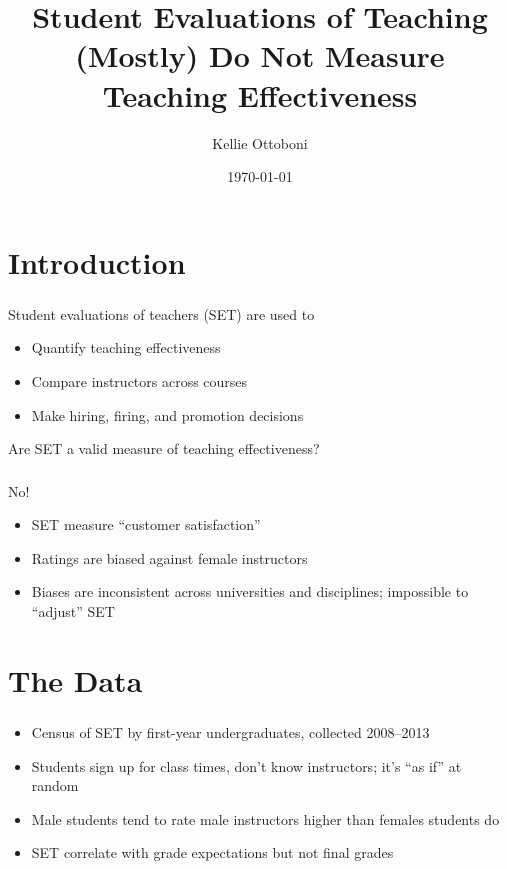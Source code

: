 \documentclass{beamer}
\title[SET]{Student Evaluations of Teaching (Mostly) Do Not Measure Teaching Effectiveness}
\author{Kellie Ottoboni}
\institute[]{Department of Statistics, UC Berkeley \\ Berkeley Institute for Data Science}
\date{\today}
\begin{document}
\frame{\titlepage}

\section{Introduction}
\frame
{
  \frametitle{}
 \begin{center}
 \Large{ Student evaluations of teachers (SET) are used to} \\
  \begin{itemize}
  \item Quantify teaching effectiveness
  \item Compare instructors across courses
  \item Make hiring, firing, and promotion decisions  
  \end{itemize}
  \vfill
Are SET a valid measure of teaching effectiveness?
\end{center}
}

\frame
{
  \frametitle{}
  \begin{center}
  \Huge{No!}
\vfill
\Large
  \begin{itemize}
  \item SET measure ``customer satisfaction''
  \item Ratings are biased against female instructors
  \item Biases are inconsistent across universities and disciplines; impossible to ``adjust'' SET
  \end{itemize}
  \end{center}
}

\section{The Data}
\frame
{
  \frametitle{\cite{Boring2015}}
  \Large
\begin{itemize}
\item Census of SET by first-year undergraduates, collected 2008--2013
\item Students sign up for class times, don't know instructors; it's ``as if'' at random
\item Male students tend to rate male instructors higher than females students do 
\item SET correlate with grade expectations but not final grades
\end{itemize}
}
\end{document}
